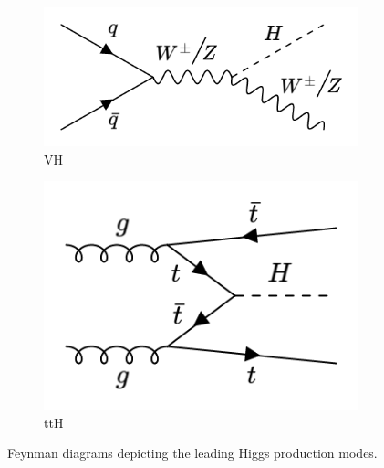 \begin{figure}[htp]
     \hfill 
     \\
        \begin{subfigure}[b]{0.3\textwidth}
         \centering
         \includegraphics[width=\textwidth]{figures/theory_chapter/VH.png}
         \caption{VH}
         \label{fig:VH}
     \end{subfigure}
     \hfill
         \begin{subfigure}[b]{0.3\textwidth}
         \centering
         \includegraphics[width=\textwidth]{figures/theory_chapter/ttH.png}
         \caption{ttH}
         \label{fig:ttH}
     \end{subfigure}
     \hfill 
  \label{fig:Higgsmodes}
  \caption{Feynman diagrams depicting the leading Higgs production modes.}  
\end{figure}

